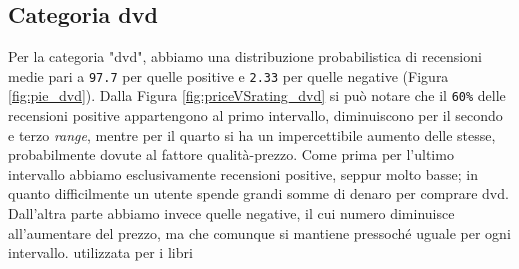 		
		\subsection{Categoria dvd}
		Per la categoria "dvd", abbiamo una distribuzione probabilistica di recensioni medie pari a \verb|97.7| per quelle positive e \verb|2.33| per quelle negative (Figura \ref{fig:pie_dvd}).
		Dalla Figura \ref{fig:priceVSrating_dvd} si può notare che il \verb|60%| delle recensioni positive appartengono al primo intervallo, diminuiscono per il secondo e terzo \textit{range}, mentre per il quarto si ha un impercettibile aumento delle stesse, probabilmente dovute al fattore qualità-prezzo. Come prima per l'ultimo intervallo abbiamo esclusivamente recensioni positive, seppur molto basse; in quanto difficilmente un utente spende grandi somme di denaro per comprare dvd. Dall'altra parte abbiamo invece quelle negative, il cui numero diminuisce all'aumentare del prezzo, ma che comunque si mantiene pressoché uguale per ogni intervallo.
		 utilizzata per i libri
		
